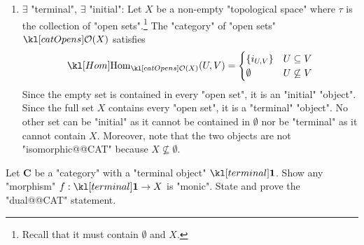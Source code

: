 \documentclass[main.tex]{subfiles}
\begin{document}
\begin{exmps}
\begin{enumerate}
		For a more interesting example, consider the "category" $\catField$. Its underlying "oriented graph" is disconnected\footnote{There are "objects" with no "morphisms" between them.} because there are no "field homomorphisms" between "fields" of different "characteristic". Therefore, $\catField$ has no "initial" nor "terminal" "objects".
		\item $\exists$ "terminal", $\exists$ "initial": Let $X$ be a non-empty "topological space" where $\tau$ is the collection of "open sets".\footnote{Recall that it must contain $\emptyset$ and $X$.} The "category" of "open sets" $\catOpens(X)$ satisfies
		\[\Hom_{\catOpens(X)}(U,V) = \begin{cases}\{i_{U,V}\} & U \subseteq V\\ \emptyset & U \not\subseteq V\end{cases}\]
		Since the empty set is contained in every "open set", it is an "initial" "object". Since the full set $X$ contains every "open set", it is a "terminal" "object". No other set can be "initial" as it cannot be contained in $\emptyset$ nor be "terminal" as it cannot contain $X$. Moreover, note that the two objects are not "isomorphic@@CAT" because $X \not\subseteq \emptyset$.
	\end{enumerate}
\end{exmps}

\begin{exer}\label{exer:duality:morterminal}
	Let $\mathbf{C}$ be a "category" with a "terminal object" $\terminal$. Show any "morphism" $f: \terminal \rightarrow X$ is "monic". State and prove the "dual@@CAT" statement.
\end{exer}
\end{document}
